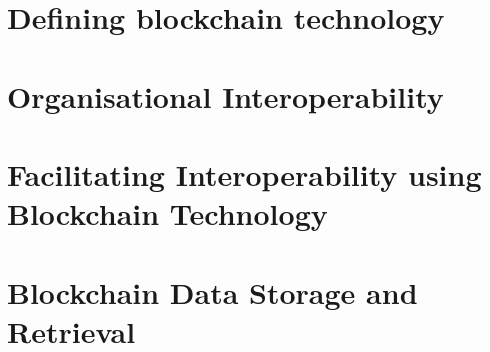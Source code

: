 \section{Defining blockchain technology}

\section{Organisational Interoperability}

\section{Facilitating Interoperability using Blockchain Technology}


\section{Blockchain Data Storage and Retrieval}